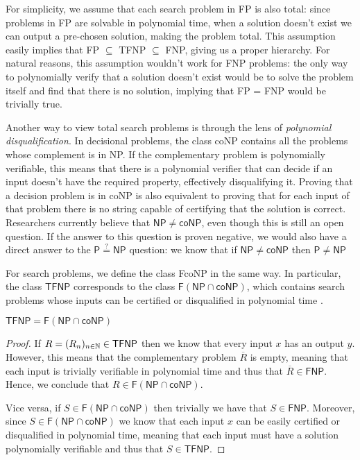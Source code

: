 For simplicity, we assume that each search problem in \textsf{FP} is also total: since problems in \textsf{FP} are solvable in polynomial time, when a solution doesn't exist we can output a pre-chosen  solution, making the problem total. This assumption easily implies that \textsf{FP} $\subseteq$ \textsf{TFNP} $\subseteq$ \textsf{FNP}, giving us a proper hierarchy. For natural reasons, this assumption wouldn't work for \textsf{FNP} problems: the only way to polynomially verify that a solution doesn't exist would be to solve the problem itself and find that there is no solution, implying that \textsf{FP} = \textsf{FNP} would be trivially true.

Another way to view total search problems is through the lens of \textit{polynomial disqualification}. In decisional problems, the class \textsf{coNP} contains all the problems whose complement is in \textsf{NP}. If the complementary problem is polynomially verifiable, this means that there is a polynomial verifier that can decide if an input doesn't have the required property, effectively disqualifying it. Proving that a decision problem is in \textsf{coNP} is also equivalent to proving that for each input of that problem there is no string capable of certifying that the solution is correct. Researchers currently believe that $\mathsf{NP} \neq \mathsf{coNP}$, even though this is still an open question. If the answer to this question is proven negative, we would also have a direct answer to the $\mathsf{P} \stackrel{?}{=} \mathsf{NP}$ question: we know that if $\mathsf{NP} \neq \mathsf{coNP}$ then $\mathsf{P} \neq \mathsf{NP}$ \cite{complexity_arora_barak, sipser_computation}

For search problems, we define the class \textsf{FcoNP} in the same way. In particular, the class $\textsf{TFNP}$ corresponds to the class $\mathsf{F}(\mathsf{NP} \cap \mathsf{coNP})$, which contains search problems whose inputs can be certified or disqualified in polynomial time \cite{tfnp_f_np_conp}.

\begin{proposition}
    \label{tfnp_f_np_conp}
    $\mathsf{TFNP} = \mathsf{F}(\mathsf{NP} \cap \mathsf{coNP})$
\end{proposition}

\begin{proof}
 If $R = (R_n)_{n \in \mathbb{N}} \in \textsf{TFNP}$ then we know that every input $x$ has an output $y$. However, this means that the complementary problem $\overline{R}$ is empty, meaning that each input is trivially verifiable in polynomial time and thus that $\overline{R} \in \textsf{FNP}$. Hence, we conclude that $R \in \mathsf{F}(\mathsf{NP} \cap \mathsf{coNP})$.
    
 Vice versa, if $S \in \mathsf{F}(\mathsf{NP} \cap \mathsf{coNP})$ then trivially we have that $S \in \mathsf{FNP}$. Moreover, since $S \in \mathsf{F}(\mathsf{NP} \cap \mathsf{coNP})$ we know that each input $x$ can be easily certified or disqualified in polynomial time, meaning that each input must have a solution polynomially verifiable and thus that $S \in \mathsf{TFNP}$.

\end{proof}

